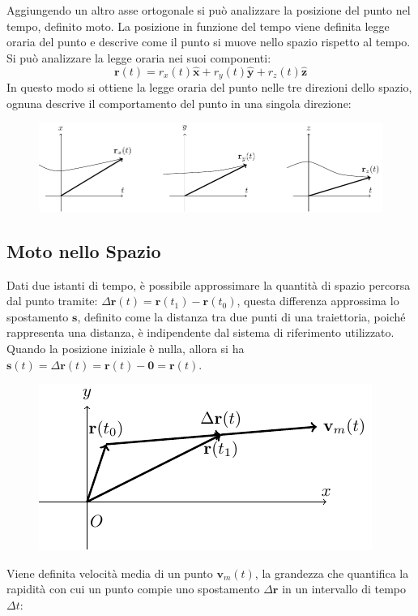 \documentclass{article}
\newcommand{\vect}[1]{\boldsymbol{\mathbf{#1}}}
\numberwithin{equation}{subsection}
\begin{document}
Aggiungendo un altro asse ortogonale si può analizzare la posizione 
del punto nel tempo, definito moto. La posizione in 
funzione del tempo viene definita legge oraria del punto 
e descrive come il punto si muove nello spazio rispetto al tempo. 
Si può analizzare la legge oraria nei suoi componenti:
\begin{equation}
    \vect{r}(t) = r_x(t)\hat{\vect{x}} + r_y(t)\hat{\vect{y}} + r_z(t)\hat{\vect{z}}
\end{equation}
In questo modo si ottiene la legge oraria del punto nelle 
tre direzioni dello spazio, ognuna descrive il comportamento del 
punto in una singola direzione:

\begin{figure}[H]%
    \centering
    \includegraphics{traiettoria-xyz.pdf}%
\end{figure}

\subsection{Moto nello Spazio}
Dati due istanti di tempo, è possibile approssimare la quantità di spazio
percorsa dal punto tramite: $\Delta\vect{r}(t) = \vect{r}(t_1) - \vect{r}(t_0)$, questa differenza 
approssima lo spostamento $\vect{s}$, definito come la distanza tra due punti di una traiettoria, poiché rappresenta una distanza, è indipendente 
dal sistema di riferimento utilizzato. Quando 
la posizione iniziale è nulla, allora si ha 
$\vect{s}(t)=\Delta\vect{r}(t)=\vect{r}(t)-\vect{0}=\vect{r}(t)$.
    
\begin{figure}[H]%
    \centering
    \includegraphics{spostamento.pdf}%
\end{figure}
Viene definita velocità media di un punto $\vect{v}_m(t)$, la grandezza che quantifica la rapidità con cui un punto compie uno spostamento $\Delta \vect{r}$ 
in un intervallo di tempo $\Delta t$: 
\end{document}
